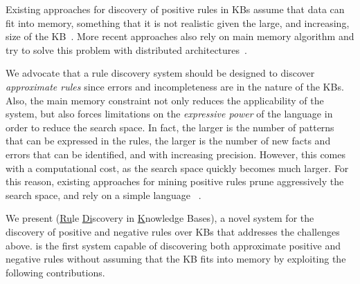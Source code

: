 Existing approaches for discovery of positive rules in KBs assume that data can fit into memory, something that it is not realistic given the large, and increasing, size of the KB~\cite{abedjan2014amending,galarraga2015fast}. More recent approaches also rely on main memory algorithm and try to solve this problem with distributed architectures~\cite{Chen:2016,DBLP:conf/sigmod/FaridRIHC16}.



\vspace{1ex}
We advocate that a rule discovery system should be designed to discover {\em approximate rules} since errors and incompleteness are in the nature of the KBs. Also, the main memory constraint not only reduces the applicability of the system, but also forces limitations on the {\em expressive power} of the language in order to reduce the search space.
In fact, the larger is the number of patterns that can be expressed in the rules, %
the larger is the number of new facts and errors that can be identified, and with increasing precision. However, this comes with a computational cost, as the search space quickly becomes much larger. For this reason, existing approaches for mining positive rules prune aggressively the search space, and rely on a simple language%
~\cite{Chen:2016,abedjan2014amending,galarraga2015fast}.

\vspace{1ex}
We present \krd (\underline{Ru}le \underline{Di}scovery in \underline{K}nowledge Bases), a novel system for the discovery of positive and negative rules %
over KBs that addresses the challenges above.  
\krd is the first system capable of discovering both approximate positive and negative rules without
assuming that the KB fits into memory by exploiting the following contributions.

